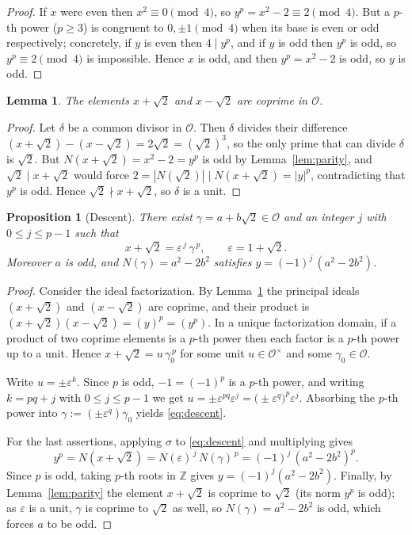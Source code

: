 \documentclass{amsart}
\newtheorem{lemma}{Lemma}
\newtheorem{proposition}{Proposition}
\theoremstyle{definition}
\begin{document}
\begin{proof}
If $x$ were even then $x^2\equiv 0\pmod 4$, so $y^p=x^2-2\equiv 2\pmod 4$. But a
$p$-th power ($p\ge 3$) is congruent to $0,\pm1\pmod 4$ when its base is even or
odd respectively; concretely, if $y$ is even then $4\mid y^p$, and if $y$ is odd
then $y^p$ is odd, so $y^p\equiv 2\pmod 4$ is impossible. Hence $x$ is odd, and
then $y^p=x^2-2$ is odd, so $y$ is odd.
\end{proof}

\begin{lemma}\label{lem:coprime}
The elements $x+\sqrt2$ and $x-\sqrt2$ are coprime in $\mathcal O$.
\end{lemma}

\begin{proof}
Let $\delta$ be a common divisor in $\mathcal O$. Then $\delta$ divides their
difference $(x+\sqrt2)-(x-\sqrt2)=2\sqrt2=(\sqrt2)^3$, so the only prime that can
divide $\delta$ is $\sqrt2$. But $N(x+\sqrt2)=x^2-2=y^p$ is odd by
Lemma~\ref{lem:parity}, and $\sqrt2\mid x+\sqrt2$ would force
$2=|N(\sqrt2)|\mid N(x+\sqrt2)=|y|^p$, contradicting that $y^p$ is odd. Hence
$\sqrt2\nmid x+\sqrt2$, so $\delta$ is a unit.
\end{proof}

\begin{proposition}[Descent]\label{prop:descent}
There exist $\gamma=a+b\sqrt2\in\mathcal O$ and an integer $j$ with
$0\le j\le p-1$ such that
\begin{equation}\label{eq:descent}
x+\sqrt2=\varepsilon^{\,j}\,\gamma^{\,p},\qquad \varepsilon=1+\sqrt2 .
\end{equation}
Moreover $a$ is odd, and $N(\gamma)=a^2-2b^2$ satisfies
$y=(-1)^{j}\,(a^2-2b^2)$.
\end{proposition}

\begin{proof}
Consider the ideal factorization. By Lemma~\ref{lem:coprime} the principal
ideals $(x+\sqrt2)$ and $(x-\sqrt2)$ are coprime, and their product is
$(x+\sqrt2)(x-\sqrt2)=(y)^p=(y^p)$. In a unique factorization domain, if a
product of two coprime elements is a $p$-th power then each factor is a $p$-th
power up to a unit. Hence $x+\sqrt2=u\,\gamma_0^{\,p}$ for some unit
$u\in\mathcal O^\times$ and some $\gamma_0\in\mathcal O$.

Write $u=\pm\varepsilon^{k}$. Since $p$ is odd, $-1=(-1)^p$ is a $p$-th power, and
writing $k=pq+j$ with $0\le j\le p-1$ we get
$u=\pm\varepsilon^{pq}\varepsilon^{j}=\big(\pm\varepsilon^{q}\big)^{p}\varepsilon^{j}$.
Absorbing the $p$-th power into $\gamma:=(\pm\varepsilon^{q})\gamma_0$ yields
\eqref{eq:descent}.

For the last assertions, applying $\sigma$ to \eqref{eq:descent} and multiplying
gives
\[
y^p=N(x+\sqrt2)=N(\varepsilon)^{\,j}\,N(\gamma)^{\,p}
   =(-1)^{j}\,(a^2-2b^2)^{p}.
\]
Since $p$ is odd, taking $p$-th roots in $\mathbb Z$ gives
$y=(-1)^{j}(a^2-2b^2)$. Finally, by Lemma~\ref{lem:parity} the element
$x+\sqrt2$ is coprime to $\sqrt2$ (its norm $y^p$ is odd); as $\varepsilon$ is a
unit, $\gamma$ is coprime to $\sqrt2$ as well, so $N(\gamma)=a^2-2b^2$ is odd,
which forces $a$ to be odd.
\end{proof}
\end{document}

